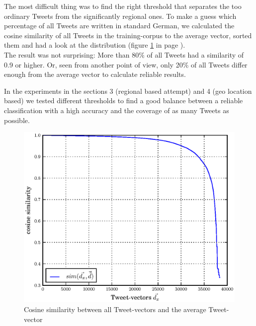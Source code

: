 \documentclass[../Main.tex]{subfiles}
\begin{document}
The most difficult thing was to find the right threshold that separates the too ordinary Tweets from the significantly regional ones. To make a guess which percentage of all Tweets are written in standard German, we calculated the cosine similarity of all Tweets in the training-corpus to the average vector, sorted them and had a look at the distribution (figure \ref{cos_distribution} in page \pageref{cos_distribution}). \\
The result was not surprising: More than 80\% of all Tweets had a similarity of 0.9 or higher. Or, seen from another point of view, only 20\% of all Tweets differ enough from the average vector to calculate reliable results.

In the experiments in the sections 3 (regional based attempt) and 4 (geo location based) we tested different thresholds to find a good balance between a reliable classification with a high accuracy and the coverage of as many Tweets as possible.

\begin{figure}
  \begin{center}
   \includegraphics[width=\columnwidth]{../img/cos-verteilung.eps}
    \caption{\label{cos_distribution} Cosine similarity between all Tweet-vectors and the average Tweet-vector}
  \end{center}
\end{figure}

\end{document}
